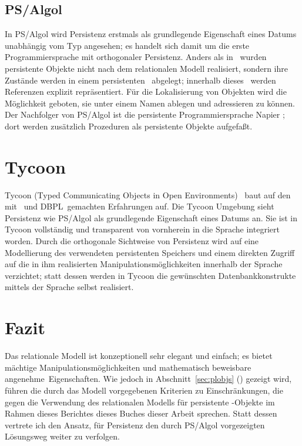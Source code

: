 \subsection{PS/Algol}
%
In PS/Algol \cite[]{bib:cl91}
\cite[]{bib:ni88} wird Persistenz erstmals als
grundlegende Eigenschaft eines Datums unabh\"{a}ngig vom Typ angesehen;
es handelt sich damit um die erste Programmiersprache mit orthogonaler
Persistenz. Anders als in \pascalr\ wurden persistente Objekte nicht
nach dem relationalen Modell realisiert, sondern ihre Zust\"{a}nde werden
in einem persistenten \heap\ abgelegt; innerhalb dieses
\heap[s]\ werden Referenzen explizit repr\"{a}sentiert. F\"{u}r die
Lokalisierung von Objekten wird die M\"{o}glichkeit geboten, sie unter
einem Namen ablegen und adressieren zu k\"{o}nnen. Der Nachfolger von
PS/Algol ist die persistente Programmiersprache Napier
\cite{bib:mo89b} \cite{bib:mo89a}; dort werden
zus\"{a}tzlich Prozeduren als persistente Objekte aufgefa\ss{}t.
%
%
\section{Tycoon}
%
Tycoon (Typed Communicating Objects in Open Environments)
\cite{bib:ma93} \cite{bib:ma92c}\ baut auf den mit \pascalr\
und \mbox{DBPL}\ gemachten Erfahrungen auf.  Die Tycoon Umgebung sieht
Persistenz wie PS/Algol als grundlegende Eigenschaft eines Datums an.
Sie ist in Tycoon vollst\"{a}ndig und transparent von vornherein in die
Sprache integriert worden. Durch die orthogonale Sichtweise von
Persistenz wird auf eine Modellierung des verwendeten persistenten
Speichers und einem direkten Zugriff auf die in ihm realisierten
Manipulationsm\"{o}glichkeiten innerhalb der Sprache verzichtet; statt
dessen werden in Tycoon die gew\"{u}nschten Datenbankkonstrukte mittels
der Sprache selbst realisiert.
%
\section{Fazit}
%
Das relationale Modell ist konzeptionell sehr elegant und einfach; es
bietet m\"{a}chtige Manipulationsm\"{o}glichkeiten und mathematisch
beweisbare \rglq{}angenehme\rgrq\ Eigenschaften. Wie jedoch in
Abschnitt~\ref{sec:plobjs} (\citepage{\pageref{sec:plobjs}}) gezeigt
wird, f\"{u}hren die durch das Modell vorgegebenen Kriterien zu
Einschr\"{a}nkungen, die gegen die Verwendung des relationalen Modells
f\"{u}r persistente \clos-Objekte im Rahmen \ifbericht dieses
Berichtes \else\ifbuch dieses Buches \else dieser Arbeit \fi\fi
sprechen. Statt dessen vertrete ich den Ansatz, f\"{u}r Persistenz den
durch PS/Algol vorgezeigten L\"{o}sungsweg weiter zu verfolgen.
